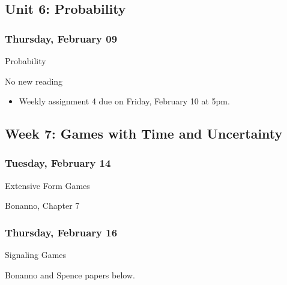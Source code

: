 \documentclass[
]{article}
\providecommand{\tightlist}{%
  \setlength{\itemsep}{0pt}\setlength{\parskip}{0pt}}
\begin{document}
\hypertarget{unit-6-probability}{%
\subsection{Unit 6: Probability}\label{unit-6-probability}}

\hypertarget{thursday-february-09}{%
\subsubsection{Thursday, February 09}\label{thursday-february-09}}

\begin{description}
\tightlist
\item[Topic]
Probability
\item[Reading]
No new reading
\end{description}

\begin{itemize}
\tightlist
\item
  Weekly assignment 4 due on Friday, February 10 at 5pm.
\end{itemize}

\hypertarget{week-7-games-with-time-and-uncertainty}{%
\subsection{Week 7: Games with Time and
Uncertainty}\label{week-7-games-with-time-and-uncertainty}}

\begin{multicols}{2}

\hypertarget{tuesday-february-14}{%
\subsubsection{Tuesday, February 14}\label{tuesday-february-14}}

\begin{description}
\tightlist
\item[Topic]
Extensive Form Games
\item[Reading]
Bonanno, Chapter 7
\end{description}

\hypertarget{thursday-february-16}{%
\subsubsection{Thursday, February 16}\label{thursday-february-16}}

\begin{description}
\tightlist
\item[Topic]
Signaling Games
\item[Reading]
Bonanno and Spence papers below.
\end{description}

\end{multicols}
\end{document}
